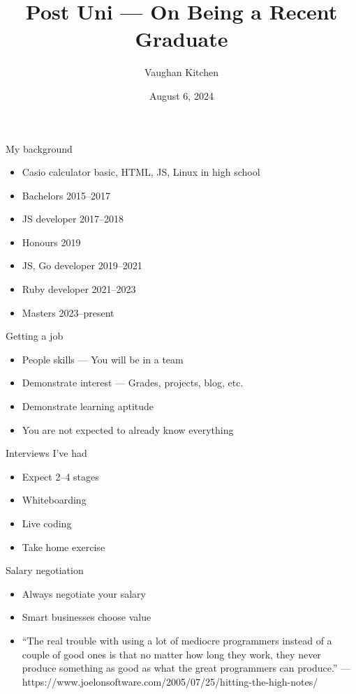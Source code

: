 \documentclass{beamer}
\title{Post Uni --- On Being a Recent Graduate}
\author{Vaughan Kitchen}
\date{August 6, 2024}
\begin{document}
\begin{frame}
\titlepage
\end{frame}

\begin{frame}{My background}
\begin{itemize}
\item Casio calculator basic, HTML, JS, Linux in high school
\item Bachelors 2015--2017
\item JS developer 2017--2018
\item Honours 2019
\item JS, Go developer 2019--2021
\item Ruby developer 2021--2023
\item Masters 2023--present
\end{itemize}
\end{frame}

\begin{frame}{Getting a job}
\begin{itemize}
\item People skills --- You will be in a team
\item Demonstrate interest --- Grades, projects, blog, etc.
\item Demonstrate learning aptitude
\item You are not expected to already know everything
\end{itemize}
\end{frame}

\begin{frame}{Interviews I've had}
\begin{itemize}
\item Expect 2--4 stages
\item Whiteboarding
\item Live coding
\item Take home exercise
\end{itemize}
\end{frame}

\begin{frame}{Salary negotiation}
\begin{itemize}
\item Always negotiate your salary
\item Smart businesses choose value
\item ``The real trouble with using a lot of mediocre programmers instead of a couple of good ones is that no matter how long they work, they never produce something as good as what the great programmers can produce.'' --- https://www.joelonsoftware.com/2005/07/25/hitting-the-high-notes/
\end{itemize}
\end{frame}
\end{document}
